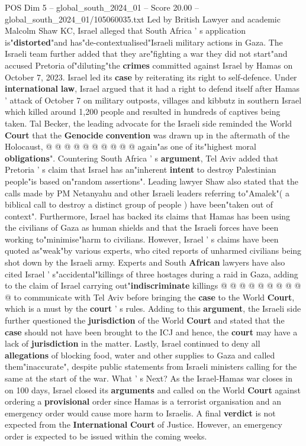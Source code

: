\begin{textsample}{POS Dim 5 – global\_south\_2024\_01 – Score 20.00 – global\_south\_2024\_01/105060035.txt}
Led by British Lawyer and academic Malcolm Shaw KC, Israel alleged that South Africa ' s application is"\textbf{distorted}"and has"de-contextualised"Israeli military actions in Gaza.
The Israeli team further added that they are"fighting a war they did not start"and accused Pretoria of"diluting"the \textbf{crimes} committed against Israel by Hamas on October 7, 2023.
Israel led its \textbf{case} by reiterating its right to self-defence.
Under \textbf{international} \textbf{law}, Israel argued that it had a right to defend itself after Hamas ' attack of October 7 on military outposts, villages and kibbutz in southern Israel which killed around 1,200 people and resulted in hundreds of captives being taken.
Tal Becker, the leading advocate for the Israeli side reminded the World \textbf{Court} that the \textbf{Genocide} \textbf{convention} was drawn up in the aftermath of the Holocaust, @ @ @ @ @ @ @ @ @ @ again"as one of its"highest moral \textbf{obligations}".
Countering South Africa ' s \textbf{argument}, Tel Aviv added that Pretoria ' s claim that Israel has an"inherent \textbf{intent} to destroy Palestinian people"is based on"random assertions".
Leading lawyer Shaw also stated that the calls made by PM Netanyahu and other Israeli leaders referring to"Amalek"( a biblical call to destroy a distinct group of people ) have been"taken out of context".
Furthermore, Israel has backed its claims that Hamas has been using the civilians of Gaza as human shields and that the Israeli forces have been working to"minimise"harm to civilians.
However, Israel ' s claims have been quoted as"weak"by various experts, who cited reports of unharmed civilians being shot down by the Israeli army.
Experts and South \textbf{African} lawyers have also cited Israel ' s"accidental"killings of three hostages during a raid in Gaza, adding to the claim of Israel carrying out"\textbf{indiscriminate} killings @ @ @ @ @ @ @ @ @ @ to communicate with Tel Aviv before bringing the \textbf{case} to the World \textbf{Court}, which is a must by the \textbf{court} ' s rules.
Adding to this \textbf{argument}, the Israeli side further questioned the \textbf{jurisdiction} of the World \textbf{Court} and stated that the \textbf{case} should not have been brought to the ICJ and hence, the \textbf{court} may have a lack of \textbf{jurisdiction} in the matter.
Lastly, Israel continued to deny all \textbf{allegations} of blocking food, water and other supplies to Gaza and called them"inaccurate", despite public statements from Israeli ministers calling for the same at the start of the war.
What ' s Next?
As the Israel-Hamas war closes in on 100 days, Israel closed its \textbf{arguments} and called on the World \textbf{Court} against ordering a \textbf{provisional} order since Hamas is a terrorist organisation and an emergency order would cause more harm to Israelis.
A final \textbf{verdict} is not expected from the \textbf{International} \textbf{Court} of Justice.
However, an emergency order is expected to be issued within the coming weeks.


\end{textsample}
